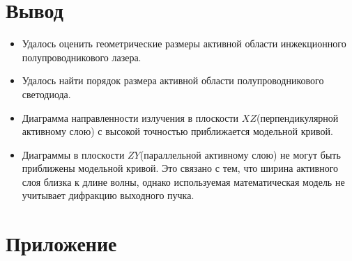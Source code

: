 \documentclass[a4paper, 12pt]{extarticle}
\begin{document}
\section*{\textcolor{header}{Вывод}}

\begin{itemize}
    \item Удалось оценить геометрические размеры активной области инжекционного полупроводникового лазера.
    \item Удалось найти порядок размера активной области полупроводникового светодиода.
    \item Диаграмма направленности излучения в плоскости $XZ$(перпендикулярной активному слою) с высокой точностью приближается модельной кривой.
    \item Диаграммы в плоскости $ZY$(параллельной активному слою) не могут быть приближены модельной кривой. Это связано с тем, что ширина активного слоя близка к длине волны, однако используемая математическая модель не учитывает дифракцию выходного пучка.
\end{itemize}

\newpage
\section*{\textcolor{header}{Приложение}}
\end{document}
